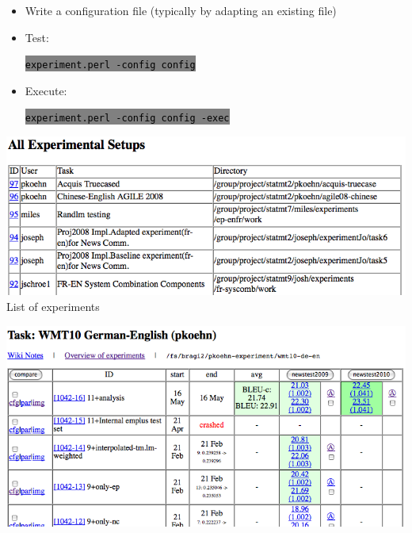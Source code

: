 \documentclass[landscape]{uedslides2C}
\newcommand{\littlecode}[1]{\colorbox{gray}{\textcolor{black}{\small \tt #1}}}
\begin{document}

\vspace{20mm}
\begin{itemize}
\item Write a configuration file
(typically by adapting an existing file)
\vspace{5mm}
\item Test:
\vspace{-10mm}
\begin{center}
\littlecode{\normalsize experiment.perl -config config}
\end{center}
\vspace{5mm}
\item Execute:
\vspace{-10mm}
\begin{center}
\littlecode{\normalsize experiment.perl -config config -exec}
\end{center}
\end{itemize}


\begin{center}
\includegraphics[scale=1]{web-interface-experiments.png}\\[5mm]
List of experiments
\end{center}


\begin{center}\vspace{-9mm}
\includegraphics[scale=1]{web-interface-runs}
\end{center}
\end{document}
